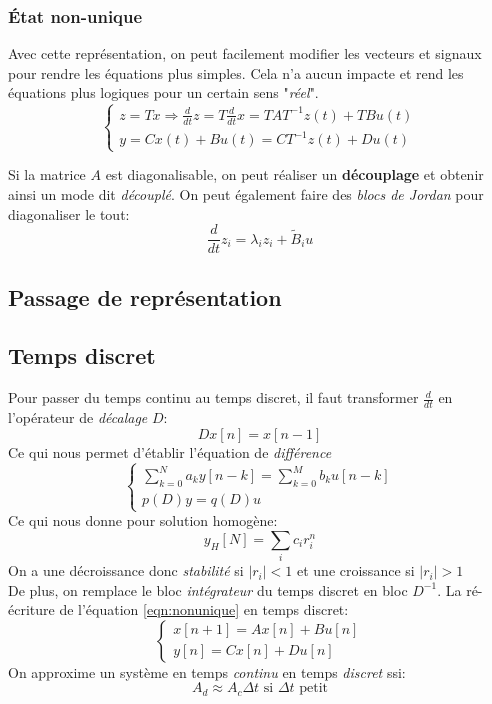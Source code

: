 \documentclass{report}
\begin{document}
\subsubsection{État non-unique}
Avec cette représentation, on peut facilement modifier les vecteurs et signaux pour rendre les équations plus simples. Cela n'a aucun impacte et rend les équations plus logiques pour un certain sens "\textit{réel}".
\begin{equation} \label{eqn:nonunique}
\begin{cases}
z = Tx \Rightarrow \frac{d}{dt}z = T\frac{d}{dt}x = TAT^{-1}z(t) + TBu(t)\\
y = Cx(t) + Bu(t) = CT^{-1}z(t) + Du(t) 
\end{cases}
\end{equation}

Si la matrice $A$ est diagonalisable, on peut réaliser un \textbf{découplage} et obtenir ainsi un mode dit \textit{découplé}. On peut également faire des \textit{blocs de Jordan} pour diagonaliser le tout:
\begin{equation}
\frac{d}{dt} z_i = \lambda_i z_i + \tilde{B}_i u
\end{equation}

\subsection{Passage de représentation}
\subsection{Temps discret}
Pour passer du temps continu au temps discret, il faut transformer $\frac{d}{dt}$ en l'opérateur de \textit{décalage} $D$:
\begin{equation}
Dx[n] =  x[n-1]
\end{equation}
Ce qui nous permet d'établir l'équation de \textit{différence}
\begin{equation}
\begin{cases}
\sum_{k=0}^N a_k y[n-k] = \sum_{k=0}^M b_ku[n-k]\\
p(D)y = q(D)u
\end{cases}
\end{equation}
Ce qui nous donne pour solution homogène:
\begin{equation}
y_H [N] = \sum_i c_i r_i^n
\end{equation}
On a une décroissance donc \textit{stabilité} si $|r_i| < 1$ et une croissance si $|r_i| > 1$\\
De plus, on remplace le bloc \textit{intégrateur} du temps discret en bloc $D^{-1}$. La ré-écriture de l'équation \ref{eqn:nonunique} en temps discret:
\begin{equation}
\begin{cases}
x[n+1] = Ax[n] + Bu[n]\\
y[n] = Cx[n] + Du[n]
\end{cases}
\end{equation}
On approxime un système en temps \textit{continu} en temps \textit{discret} ssi:
\begin{equation}
A_d \approx A_c \Delta t \text{ si } \Delta t \text{ petit}
\end{equation}
\end{document}

